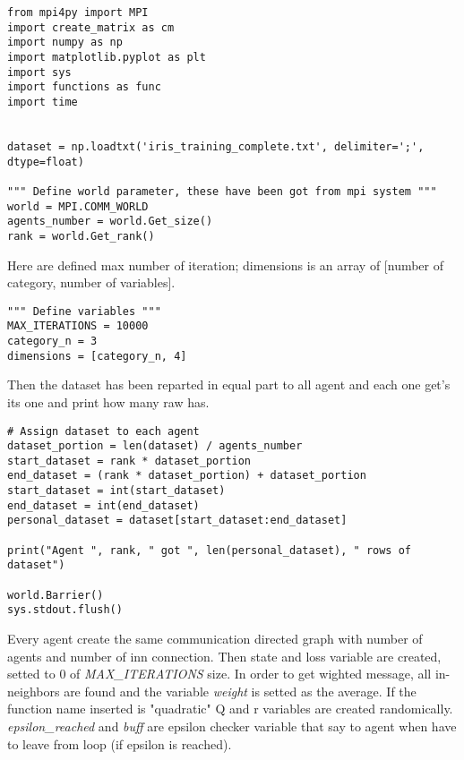 \documentclass[a4paper,11pt,oneside]{book}
\begin{document}
\begin{lstlisting}
from mpi4py import MPI
import create_matrix as cm
import numpy as np
import matplotlib.pyplot as plt
import sys
import functions as func
import time


dataset = np.loadtxt('iris_training_complete.txt', delimiter=';', dtype=float)

""" Define world parameter, these have been got from mpi system """
world = MPI.COMM_WORLD
agents_number = world.Get_size()
rank = world.Get_rank()
\end{lstlisting}

Here are defined max number of iteration; dimensions is an array of [number of category, number of variables].

\begin{lstlisting}
""" Define variables """
MAX_ITERATIONS = 10000
category_n = 3
dimensions = [category_n, 4]
\end{lstlisting}

Then the dataset has been reparted in equal part to all agent and each one get's its one and print how many raw has.

\begin{lstlisting}
# Assign dataset to each agent
dataset_portion = len(dataset) / agents_number
start_dataset = rank * dataset_portion
end_dataset = (rank * dataset_portion) + dataset_portion
start_dataset = int(start_dataset)
end_dataset = int(end_dataset)
personal_dataset = dataset[start_dataset:end_dataset]

print("Agent ", rank, " got ", len(personal_dataset), " rows of dataset")

world.Barrier()
sys.stdout.flush()
\end{lstlisting}

Every agent create the same communication directed graph with number of agents and number of inn connection. Then state and loss variable are
created, setted to 0 of \textit{MAX\_ITERATIONS} size. In order to get wighted message, all in-neighbors are found and the variable \textit{weight}
is setted as the average. If the function name inserted is "quadratic" Q and r variables are created randomically. \textit{epsilon\_reached} and 
\textit{buff} are epsilon checker variable that say to agent when have to leave from loop (if epsilon is reached).
\end{document}
